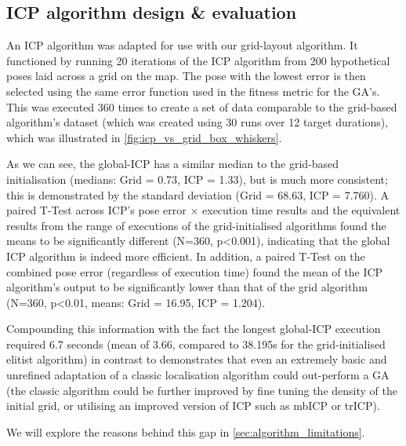 \documentclass[authoryearcitations]{UoYCSproject}
\begin{document}
\subsection{ICP algorithm design \& evaluation}
\label{subsec:icp_benchmark}
An ICP algorithm \cite{Harry_undated-ea} was adapted for use with our grid-layout algorithm. It functioned by running 20 iterations of the ICP algorithm from 200 hypothetical poses laid across a grid on the map. The pose with the lowest error is then selected using the same error function used in the fitness metric for the GA's. This was executed 360 times to create a set of data comparable to the grid-based algorithm's dataset (which was created using 30 runs over 12 target durations), which was illustrated in \autoref{fig:icp_vs_grid_box_whiskers}. 

As we can see, the global-ICP has a similar median to the grid-based initialisation (medians: Grid = 0.73, ICP = 1.33), but is much more consistent; this is demonstrated by the standard deviation (Grid = 68.63, ICP = 7.760). A paired T-Test across ICP's pose error $\times$ execution time results and the equivalent results from the range of executions of the grid-initialised algorithms found the means to be significantly different (N=360, p<0.001), indicating that the global ICP algorithm is indeed more efficient. In addition, a paired T-Test on the combined pose error (regardless of execution time) found the mean of the ICP algorithm's output to be significantly lower than that of the grid algorithm (N=360, p<0.01, means: Grid = 16.95, ICP = 1.204). 

Compounding this information with the fact the longest global-ICP execution required 6.7 seconds (mean of 3.66, compared to 38.195s for the grid-initialised elitist algorithm) in contrast to  demonstrates that even an extremely basic and unrefined adaptation of a classic localisation algorithm could out-perform a GA (the classic algorithm could be further improved by fine tuning the density of the initial grid, or utilising an improved version of ICP such as mbICP or trICP).

We will explore the reasons behind this gap in \autoref{sec:algorithm_limitations}.
\end{document}
